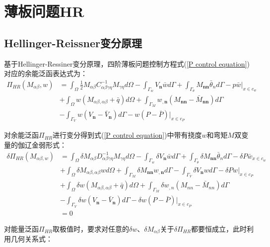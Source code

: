 \chapter{薄板问题HR}
\section{Hellinger-Reissner变分原理}
基于Hellinger-Ressiner变分原理\cite{}，四阶薄板问题控制方程式(\ref{P control equation})对应的余能泛函表达式为：
\begin{equation}\label{pfanhan}
\begin{split}
    \Pi_{H\!R}(M_{\alpha\beta},w)&=\int_{\Omega}\frac{1}{2}M_{\alpha\beta}C^{-1}_{\alpha\beta\gamma\eta}M_{\gamma\eta}d\Omega-\int_{\Gamma_w}V_{\pmb n}\bar{w}d\Gamma+\int_{\Gamma_{\theta}}M_{\pmb{nn}}\bar{\theta}_nd\Gamma-p\bar{w}\vert_{x\in{c_w}}\\
&+\int_{\Omega}w(M_{\alpha\beta,\alpha\beta}+\bar{q})d\Omega+\int_{\Gamma_M}w_{,\pmb n}(M_{\pmb{nn}}-\bar{M}_{\pmb{nn}})d\Gamma\\
&-\int_{\Gamma_V}w(V_{\pmb n}-\bar{V}_{\pmb n})d\Gamma-w(P-\bar{P})\vert_{x\in{c_P}}
\end{split}
\end{equation}\par
对余能泛函$\Pi_{H\!R}$进行变分得到式(\ref{P control equation})中带有挠度$w$和弯矩$M$双变量的伽辽金弱形式：
\begin{equation}\label{Pweakfrom}
\begin{split}
    \delta\Pi_{H\!R}(M_{\alpha\beta,w})&=\int_{\Omega}\delta M_{\alpha\beta}D^{-1}_{\alpha\beta\gamma\eta}M_{\gamma\eta}d\Omega-\int_{\Gamma_w}\delta V_{\pmb n}\bar{w}d\Gamma+\int_{\Gamma_{\theta}}\delta M_{\pmb{nn}}\bar{\theta}_nd\Gamma-\delta P\bar{w}_{x\in{c_w}}\\
    &+\int_{\Omega}\delta M_{\alpha\beta,\alpha\beta}wd\Omega+\int_{\Gamma_M}\delta M_{\pmb{nn}}w_{,\pmb n}d\Gamma-\int_{\Gamma_V}\delta V_{\pmb n}wd\Gamma-\delta Pw\vert_{x\in{c_P}}\\
    &+\int_{\Omega}\delta w(M_{\alpha\beta,\alpha\beta}+\bar{q})d\Omega+\int_{\Gamma_M}\delta w_{,n}(M_{nn}-\bar{M}_{nn})d\Gamma\\
    &-\int_{\Gamma_V}\delta w(V_{\pmb n}-\bar{V}_{\pmb n})d\Gamma-\delta w(P-\bar{P})\vert_{x\in{c_P}}\\
    &=0
\end{split}
\end{equation}\par
对能量泛函$\Pi_{H\!R}$取极值时，要求对任意的$\delta w$、$\delta M_{\alpha\beta}$关于$\delta\Pi_{H\!R}$都要恒成立，此时利用几何关系式：
